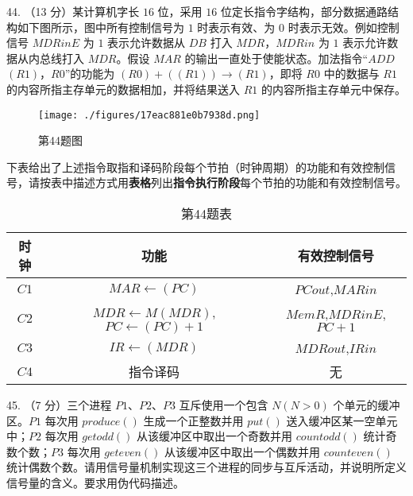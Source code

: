 44. （13 分）某计算机字长 $16$ 位，采用 $16$ 位定长指令字结构，部分数据通路结构如下图所示，图中所有控制信号为 $1$ 时表示有效、为 $0$ 时表示无效。例如控制信号 $MDRinE$ 为 $1$ 表示允许数据从 $DB$ 打入 $MDR$，$MDRin$ 为 $1$ 表示允许数据从内总线打入 $MDR$。假设 $MAR$ 的输出一直处于使能状态。加法指令“$ADD$ $(R1)$，$R0$”的功能为 $(R0)+((R1)) \rightarrow (R1)$，即将 $R0$ 中的数据与 $R1$ 的内容所指主存单元的数据相加，并将结果送入 $R1$ 的内容所指主存单元中保存。
\begin{figure}[ht]
\centering
\texttt{[image: ./figures/17eac881e0b7938d.png]}
\caption{第44题图} \label{fig_CSN09_3}
\end{figure}
下表给出了上述指令取指和译码阶段每个节拍（时钟周期）的功能和有效控制信号，请按表中描述方式用\textbf{表格}列出\textbf{指令执行阶段}每个节拍的功能和有效控制信号。
\begin{table}[ht]
\centering
\caption{第44题表}\label{tab_CSN09_2}
\begin{tabular}{|c|c|c|}
\hline
时钟 & 功能 & 有效控制信号 \\
\hline
$C1$ & $MAR\leftarrow(PC)$ & $PCout$,$MARin$ \\
\hline
$C2$ & $MDR\leftarrow M(MDR)$,$PC\leftarrow(PC)+1$ & $MemR$,$MDRinE$,$PC+1$ \\
\hline
$C3$ & $IR\leftarrow(MDR)$ & $MDRout$,$IRin$ \\
\hline
$C4$ & 指令译码 & 无 \\
\hline
\end{tabular}
\end{table}

45. （7 分）三个进程 $P1$、$P2$、$P3$ 互斥使用一个包含 $N(N>0)$ 个单元的缓冲区。$P1$ 每次用 $produce()$ 生成一个正整数并用 $put()$ 送入缓冲区某一空单元中；$P2$ 每次用 $getodd()$ 从该缓冲区中取出一个奇数并用 $countodd()$ 统计奇数个数；$P3$ 每次用 $geteven()$ 从该缓冲区中取出一个偶数并用 $counteven()$ 统计偶数个数。请用信号量机制实现这三个进程的同步与互斥活动，并说明所定义信号量的含义。要求用伪代码描述。

